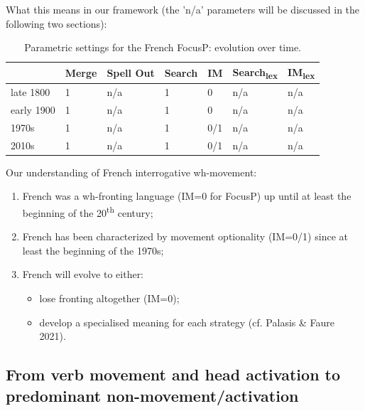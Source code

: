 \documentclass[fleqn,10pt]{wlscirep}
\begin{document}
\noindent What this means in our framework (the 'n/a' parameters will be discussed in the following two sections):

    \begin{table}[H]
        \centering
        \begin{tabular}{|l|l|l|l|l|l|l|}
        \hline
         & Merge & Spell Out & Search & IM & Search\textsubscript{lex} & IM\textsubscript{lex} \\
        \hline
        late 1800 & 1 & n/a & 1 & 0 & n/a & n/a \\
        \hline
        early 1900 & 1 & n/a & 1 & 0 & n/a & n/a \\
        \hline
        1970s & 1 & n/a & 1 & 0/1 & n/a & n/a \\
        \hline
        2010s & 1 & n/a & 1 & 0/1 & n/a & n/a \\
        \hline
        \end{tabular}
        \caption{\label{tab:samp}Parametric settings for the French FocusP: evolution over time.}
    \end{table}

\noindent Our understanding of French interrogative wh-movement:
    \begin{enumerate}
        \item French was a wh-fronting language (IM=0 for FocusP) up until at least the beginning of the 20\textsuperscript{th} century;
        \item \vspace*{-2mm} French has been characterized by movement optionality (IM=0/1) since at least the beginning of the 1970s;
        \item \vspace*{-2mm} French will evolve to either:
        \begin{itemize}
            \item \vspace*{-2mm} lose fronting altogether (IM=0);
            \item \vspace*{-2mm} develop a specialised meaning for each strategy (cf. Palasis \& Faure 2021).
        \end{itemize}    
    \end{enumerate}

\subsection*{From verb movement and head activation to predominant non-movement/activation}
\end{document}
